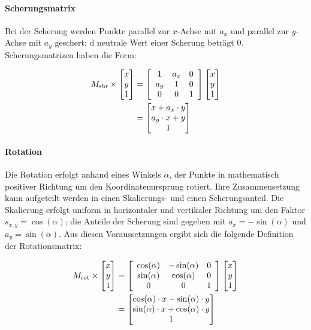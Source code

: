 \paragraph{Scherungsmatrix}
\label{par:scherung}

Bei der Scherung werden Punkte parallel zur $x$-Achse mit $a_x$ und parallel zur $y$-Achse mit $a_y$ geschert; d neutrale Wert einer Scherung beträgt 0. Scherungsmatrizen haben die Form:

{\setlength{\belowdisplayskip}{0.5ex}
\begin{align*}
    M_\text{shr} \times \begin{bmatrix} x \\ y \\ 1 \end{bmatrix}
     & =
    \left[
        \begin{array}{ccc}
            1   & a_x & 0 \\
            a_y & 1   & 0 \\
            0   & 0   & 1 \\
        \end{array}
        \right]
    \begin{bmatrix} x \\ y \\ 1 \end{bmatrix} \\
     & =
    \begin{bmatrix} x + a_x \cdot y \\ a_y \cdot x + y \\ 1 \end{bmatrix}
\end{align*}}

\paragraph{Rotation}
\label{par:rotation}

Die Rotation erfolgt anhand eines Winkels $\alpha$, der Punkte in mathematisch positiver Richtung um den Koordinatenursprung rotiert. Ihre Zusammensetzung kann aufgeteilt werden in einen Skalierungs- und einen Scherungsanteil. Die Skalierung erfolgt uniform in horizontaler und vertikaler Richtung um den Faktor $s_{x, y} = \cos(\alpha)$; die Anteile der Scherung sind gegeben mit $a_x = -\sin(\alpha)$ und $a_y = \sin(\alpha)$. Aus diesen Voraussetzungen ergibt sich die folgende Definition der Rotationsmatrix:

{\setlength{\belowdisplayskip}{0.5ex}
\begin{align*}
    M_\text{rot} \times \begin{bmatrix} x \\ y \\ 1 \end{bmatrix}
     & =
    \left[
        \begin{array}{ccc}
            \cos(\alpha) & -\sin(\alpha) & 0 \\
            \sin(\alpha) & \cos(\alpha)  & 0 \\
            0            & 0             & 1 \\
        \end{array}
        \right]
    \begin{bmatrix} x \\ y \\ 1 \end{bmatrix} \\
     & =
    \begin{bmatrix} \cos(\alpha) \cdot x - \sin(\alpha) \cdot y \\ \sin(\alpha) \cdot x + \cos(\alpha) \cdot y \\ 1 \end{bmatrix}
\end{align*}}


